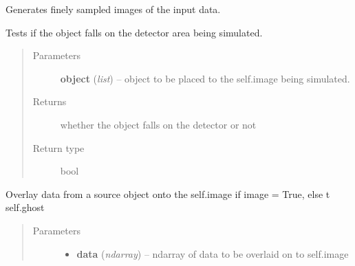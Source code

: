 \documentclass[a4paper,11pt,english]{sphinxmanual}
\begin{document}
\begin{fulllineitems}
\begin{fulllineitems}
\end{fulllineitems}


\begin{fulllineitems}
\label{simulator:simulator.simulator.VISsimulator.generateFinemaps}
Generates finely sampled images of the input data.

\end{fulllineitems}


\begin{fulllineitems}
\label{simulator:simulator.simulator.VISsimulator.objectOnDetector}
Tests if the object falls on the detector area being simulated.
\begin{quote}\begin{description}
\item[{Parameters}] \leavevmode
\textbf{object} (\emph{list}) -- object to be placed to the self.image being simulated.

\item[{Returns}] \leavevmode
whether the object falls on the detector or not

\item[{Return type}] \leavevmode
bool

\end{description}\end{quote}

\end{fulllineitems}


\begin{fulllineitems}
\label{simulator:simulator.simulator.VISsimulator.overlayToCCD}
Overlay data from a source object onto the self.image if image = True, else t self.ghost
\begin{quote}\begin{description}
\item[{Parameters}] \leavevmode\begin{itemize}
\item {} 
\textbf{data} (\emph{ndarray}) -- ndarray of data to be overlaid on to self.image


\end{itemize}
\end{description}
\end{quote}
\end{fulllineitems}
\end{fulllineitems}
\end{document}
